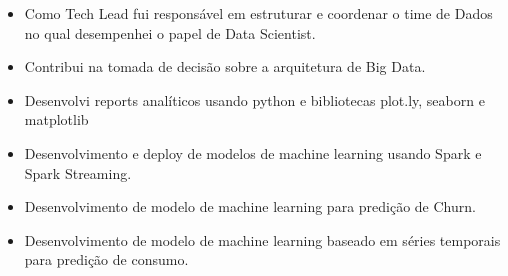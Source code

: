\documentclass[10pt,a4paper,ragged2e]{altacv}
\begin{document}
\divider

\begin{itemize}

\item  Como Tech Lead fui responsável em estruturar e coordenar o time de Dados
       no qual desempenhei o papel de Data Scientist. 

\item  Contribui na tomada de decisão sobre a arquitetura de Big Data.

\item  Desenvolvi reports analíticos usando python e bibliotecas plot.ly, seaborn e 
       matplotlib

\item  Desenvolvimento e deploy de modelos de machine learning usando Spark 
       e Spark Streaming.

\item  Desenvolvimento de modelo de machine learning para predição de Churn.

\item  Desenvolvimento de modelo de machine learning baseado em séries temporais 
       para predição de consumo.



\end{itemize}



\divider





\clearpage
\end{document}
